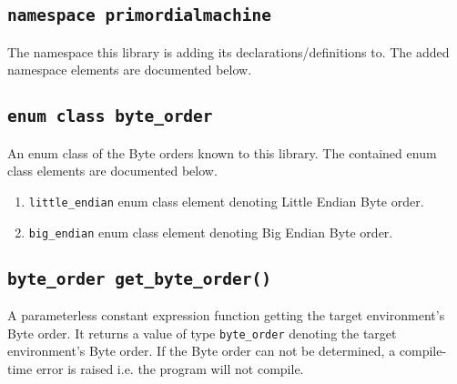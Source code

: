 \documentclass[oneside]{article}
\begin{document}
\subsection{\texttt{namespace primordialmachine}}
The namespace this library is adding its declarations/definitions to.
The added namespace elements are documented below.

\subsection{\texttt{enum class byte\_order}}
An enum class of the Byte orders known to this library.
The contained enum class elements are documented below.
\begin{enumerate}
\item \texttt{little\_endian} enum class element denoting Little Endian Byte order.
\item \texttt{big\_endian} enum class element denoting Big Endian Byte order.
\end{enumerate}

\subsection{\texttt{byte\_order get\_byte\_order()}}
A parameterless constant expression function getting the target environment's Byte order. It returns
a value of type \lstinline{byte_order} denoting the target environment's Byte order.     If the Byte
order can not be determined, a compile-time error is raised i.e. the program will not       compile.
\end{document}
